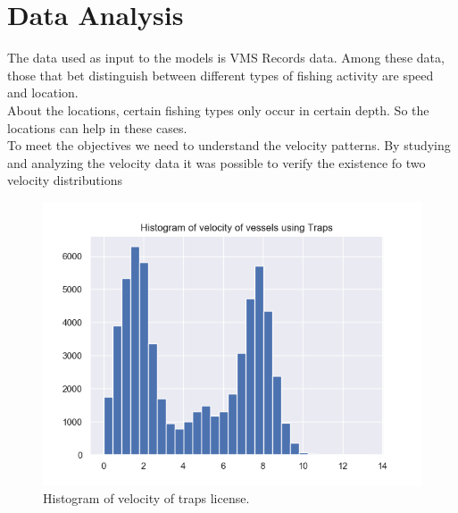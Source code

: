 

\section{Data Analysis} %
\label{sub:data_analysis}



The data used as input to the models is VMS Records data. Among these data, those that bet distinguish between different types of fishing activity are speed and location.\\
About the locations, certain fishing types only occur in certain depth. So the locations can help in these cases. \\
To meet the objectives we need to understand the velocity patterns.
By studying and analyzing the velocity data it was possible to verify the existence fo two velocity distributions

\begin{figure}[h]
    \centering
    \includegraphics[width=0.8\linewidth]{Chapters/img/h_armadilhas.png}
    \caption{Histogram of velocity of traps license.}
    \label{fig:h_armadilhas}
\end{figure}


